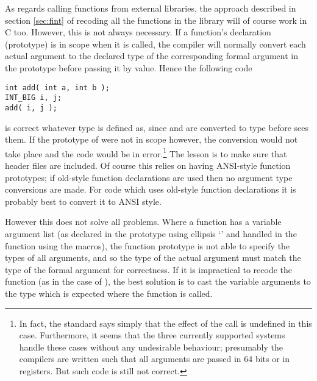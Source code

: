 \documentclass[twoside,11pt]{article}
\renewcommand{\_}{\texttt{\symbol{95}}}
\begin{document}
As regards calling functions from external libraries,
the approach described in section \ref{sec:fint} of 
recoding all the functions in the library will of course work in C too.
However, this is not always necessary.
If a function's declaration (prototype) is in scope when it is called,
the compiler will normally 
convert each actual argument to the declared type of
the corresponding formal argument in the prototype 
before passing it by value.
Hence the following code
\begin{squote}
\begin{verbatim}
int add( int a, int b );
INT_BIG i, j;
add( i, j );
\end{verbatim}
\end{squote}
is correct whatever type \cc{INT\_BIG} is defined as, 
since  and  are converted to type 
before  sees them.
If the prototype of  were not in scope however,
the conversion would not take place and the code would be
in error.\footnote{
   In fact, the standard says simply that the effect of the call is
   undefined in this case.  Furthermore, it seems that the three
   currently supported systems handle these cases without
   any undesirable behaviour; presumably the compilers are written
   such that all arguments are passed in 64 bits or in registers.
   But such code is still not correct.
}
The lesson is to make sure that header files are
included.
Of course this relies on having ANSI-style function prototypes;
if old-style function declarations are used then no argument type
conversions are made.  For code which uses old-style function 
declarations it is probably best to convert it to ANSI style.

However this does not solve all problems.
Where a function has a variable argument list
(as declared in the prototype using ellipsis `'
and handled in the function using the  macros), 
the function prototype
is not able to specify the types of all arguments,
and so the type of the actual argument must match the type of
the formal argument for correctness.  If it is impractical
to recode the function (as in the case of ),
the best solution is to cast the variable arguments to the type
which is expected where the function is called.
\end{document}
